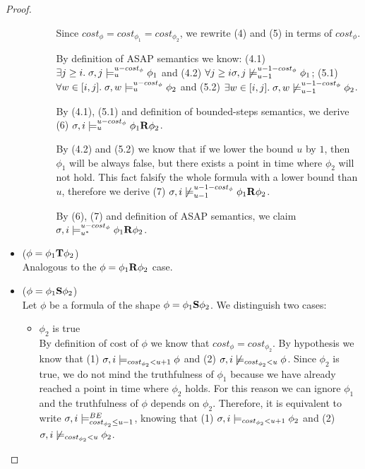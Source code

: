 \begin{theorem}
\begin{proof}
\begin{itemize}
\begin{itemize}
\begin{itemize}
            Since $cost_\phi = cost_{\phi_1} = cost_{\phi_2}$, we rewrite (4) and (5) in terms of $cost_\phi$.

            By definition of ASAP semantics we know:
            (4.1) $\exists j \geq i.\; \sigma,j \models_{u}^{u-cost_\phi} \phi_1$ and
            (4.2) $\forall j \geq i \sigma,j \not\models_{u-1}^{u-1-cost_\phi} \phi_1$;
            (5.1) $\forall w \in [i,j].\; \sigma,w \models_{u}^{u-cost_\phi} \phi_2$ and 
            (5.2) $\exists w \in [i,j].\; \sigma,w \not\models_{u-1}^{u-1-cost_\phi} \phi_2$.

            By (4.1), (5.1) and definition of bounded-steps semantics, we derive (6) $\sigma,i \models_{u}^{u-cost_\phi} \phi_1 \mathbf{R} \phi_2$.

            By (4.2) and (5.2) we know that if we lower the bound $u$ by $1$, then $\phi_1$ will be always false, but there exists a point in time where $\phi_2$ will not hold.
            This fact falsify the whole formula with a lower bound than $u$, therefore we derive (7) $\sigma,i \not\models_{u-1}^{u-1-cost_\phi} \phi_1 \mathbf{R} \phi_2$.

            By (6), (7) and definition of ASAP semantics, we claim $\sigma,i \models_{{u}^*}^{u-cost_\phi} \phi_1 \mathbf{R} \phi_2$.
            
        \end{itemize}
    \end{itemize}

    \item ($\phi = \phi_1 \mathbf{T} \phi_2$) \\
    Analogous to the $\phi = \phi_1 \mathbf{R} \phi_2$ case.

    \item ($\phi = \phi_1 \mathbf{S} \phi_2$) \\
    Let $\phi$ be a formula of the shape $\phi = \phi_1 \mathbf{S} \phi_2$.
    We distinguish two cases:
    \begin{itemize}
        \item $\phi_2$ is true \\
        By definition of cost of $\phi$ we know that $cost_\phi = cost_{\phi_2}$.
        By hypothesis we know that (1) $\sigma, i \models_{cost_{\phi_2} < u + 1} \phi$ and (2) $\sigma, i \not\models_{cost_{\phi_2} < u} \phi$.
        Since $\phi_2$ is true, we do not mind the truthfulness of $\phi_1$ because we have already reached a point in time where $\phi_2$ holds.
        For this reason we can ignore $\phi_1$ and the truthfulness of $\phi$ depends on $\phi_2$.
        Therefore, it is equivalent to write $\sigma,i \models_{cost_{\phi_2} \leq u - 1}^{BE}$, knowing that (1) $\sigma,i \models_{cost_{\phi_2} < u + 1} \phi_2$ and (2) $\sigma,i \not\models_{cost_{\phi_2} < u} \phi_2$.


\end{itemize}
\end{itemize}
\end{proof}
\end{theorem}
